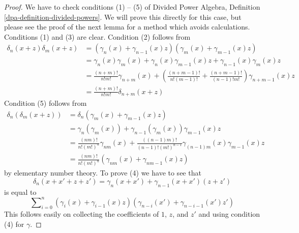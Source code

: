 \documentclass[10pt,a4paper]{amsart}
\theoremstyle{plain}
\theoremstyle{definition}
\theoremstyle{remark}
\numberwithin{equation}{subsection}
\begin{document}
\begin{proof}
We have to check conditions (1) -- (5) of
Divided Power Algebra, Definition \ref{dpa-definition-divided-powers}.
We will prove this directly for this case, but please see the proof of
the next lemma for a method which avoids calculations.
Conditions (1) and (3) are clear. Condition (2) follows from
\begin{align*}
\delta_n(x + z)\delta_m(x + z)
& =
(\gamma_n(x) + \gamma_{n - 1}(x)z)(\gamma_m(x) + \gamma_{m - 1}(x)z) \\
& = \gamma_n(x)\gamma_m(x) + \gamma_n(x)\gamma_{m - 1}(x)z +
\gamma_{n - 1}(x)\gamma_m(x)z \\
& =
\frac{(n + m)!}{n!m!} \gamma_{n + m}(x) +
\left(\frac{(n + m - 1)!}{n!(m - 1)!} +
\frac{(n + m - 1)!}{(n - 1)!m!}\right)
\gamma_{n + m - 1}(x) z \\
& =
\frac{(n + m)!}{n!m!}\delta_{n + m}(x + z)
\end{align*}
Condition (5) follows from
\begin{align*}
\delta_n(\delta_m(x + z))
& =
\delta_n(\gamma_m(x) + \gamma_{m - 1}(x)z) \\
& =
\gamma_n(\gamma_m(x)) + \gamma_{n - 1}(\gamma_m(x))\gamma_{m - 1}(x)z \\
& =
\frac{(nm)!}{n! (m!)^n} \gamma_{nm}(x) +
\frac{((n - 1)m)!}{(n - 1)! (m!)^{n - 1}}
\gamma_{(n - 1)m}(x) \gamma_{m - 1}(x) z \\
& = \frac{(nm)!}{n! (m!)^n}(\gamma_{nm}(x) + \gamma_{nm - 1}(x) z)
\end{align*}
by elementary number theory. To prove (4) we have to see that
$$
\delta_n(x + x' + z + z')
=
\gamma_n(x + x') + \gamma_{n - 1}(x + x')(z + z')
$$
is equal to
$$
\sum\nolimits_{i = 0}^n
(\gamma_i(x) + \gamma_{i - 1}(x)z)
(\gamma_{n - i}(x') + \gamma_{n - i - 1}(x')z')
$$
This follows easily on collecting the coefficients of
$1$, $z$, and $z'$ and using condition (4) for $\gamma$.
\end{proof}
\end{document}
